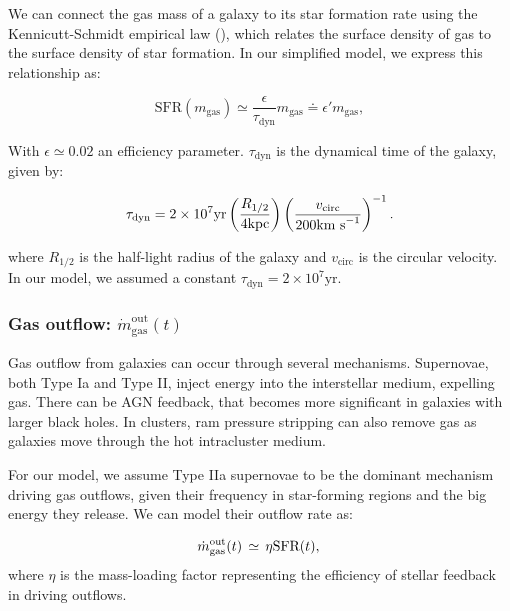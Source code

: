 \documentclass[fleqn,usenatbib]{mnras}
\begin{document}
We can connect the gas mass of a galaxy to its star formation rate using the Kennicutt-Schmidt empirical law (\cite{Kennicutt_Jr_1998}), which relates the surface density of gas to the surface density of star formation. In our simplified model, we express this relationship as:

\begin{equation}
\text{SFR}\left(m_\text{gas}\right) \simeq \dfrac{\epsilon}{\tau_\text{dyn}} m_\text{gas} \doteq \epsilon' m_\text{gas},
\label{eq:SFR_vs_gasmas}
\end{equation}

With $\epsilon \simeq 0.02$ an efficiency parameter. 
$\tau_\text{dyn}$ is the dynamical time of the galaxy, given by:


\begin{equation}
\tau_\text{dyn} = 2 \times 10^7 \text{yr} \left(\dfrac{R_{1\slash2}}{4\text{kpc}}\right) \left(\dfrac{v_\text{circ}}{200\text{km s}^{-1}}\right)^{-1}.\\
\label{eq:t_dynamical}
\end{equation}


where $R_{1/2}$ is the half-light radius of the galaxy and $v_\text{circ}$ is the circular velocity. In our model, we assumed a constant $\tau_\text{dyn} = 2 \times 10^7 \text{yr}$.


\subsubsection{\textbf{Gas outflow: $\dot{m}_\text{gas}^\text{out}(t)$}}
\label{gas_out}
Gas outflow from galaxies can occur through several mechanisms. Supernovae, both Type Ia and Type II, inject energy into the interstellar medium, expelling gas. There can be AGN feedback, that becomes more significant in galaxies with larger black holes. In clusters, ram pressure stripping can also remove gas as galaxies move through the hot intracluster medium.

For our model, we assume Type IIa supernovae to be the dominant mechanism driving gas outflows, given their frequency in star-forming regions and the big energy they release. We can model their outflow rate as:

\begin{equation}
    \dot{m}_\text{gas}^\text{out}(t) \, \simeq \, \eta\text{SFR}(t),\\
	\label{eq:mgas_outflow}
\end{equation}
where $\eta$ is the mass-loading factor representing the efficiency of stellar feedback in driving outflows.\\
\end{document}
